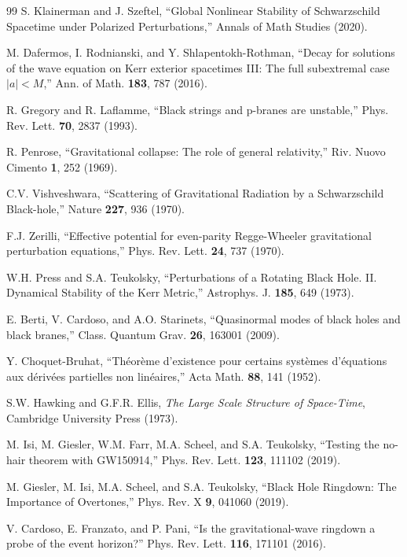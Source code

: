 \documentclass[12pt,a4paper]{article}
\begin{document}
\begin{thebibliography}{99}
S. Klainerman and J. Szeftel, ``Global Nonlinear Stability of Schwarzschild Spacetime under Polarized Perturbations,'' Annals of Math Studies (2020).

M. Dafermos, I. Rodnianski, and Y. Shlapentokh-Rothman, ``Decay for solutions of the wave equation on Kerr exterior spacetimes III: The full subextremal case $|a| < M$,'' Ann. of Math. \textbf{183}, 787 (2016).

R. Gregory and R. Laflamme, ``Black strings and p-branes are unstable,'' Phys. Rev. Lett. \textbf{70}, 2837 (1993).

R. Penrose, ``Gravitational collapse: The role of general relativity,'' Riv. Nuovo Cimento \textbf{1}, 252 (1969).

C.V. Vishveshwara, ``Scattering of Gravitational Radiation by a Schwarzschild Black-hole,'' Nature \textbf{227}, 936 (1970).

F.J. Zerilli, ``Effective potential for even-parity Regge-Wheeler gravitational perturbation equations,'' Phys. Rev. Lett. \textbf{24}, 737 (1970).

W.H. Press and S.A. Teukolsky, ``Perturbations of a Rotating Black Hole. II. Dynamical Stability of the Kerr Metric,'' Astrophys. J. \textbf{185}, 649 (1973).

E. Berti, V. Cardoso, and A.O. Starinets, ``Quasinormal modes of black holes and black branes,'' Class. Quantum Grav. \textbf{26}, 163001 (2009).

Y. Choquet-Bruhat, ``Théorème d'existence pour certains systèmes d'équations aux dérivées partielles non linéaires,'' Acta Math. \textbf{88}, 141 (1952).

S.W. Hawking and G.F.R. Ellis, \textit{The Large Scale Structure of Space-Time}, Cambridge University Press (1973).

M. Isi, M. Giesler, W.M. Farr, M.A. Scheel, and S.A. Teukolsky, ``Testing the no-hair theorem with GW150914,'' Phys. Rev. Lett. \textbf{123}, 111102 (2019).

M. Giesler, M. Isi, M.A. Scheel, and S.A. Teukolsky, ``Black Hole Ringdown: The Importance of Overtones,'' Phys. Rev. X \textbf{9}, 041060 (2019).

V. Cardoso, E. Franzato, and P. Pani, ``Is the gravitational-wave ringdown a probe of the event horizon?'' Phys. Rev. Lett. \textbf{116}, 171101 (2016).


\end{thebibliography}
\end{document}
